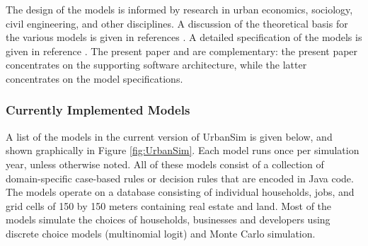 The design of the models is informed by research in urban
economics, sociology, civil engineering, and other disciplines.  A
discussion of the theoretical basis for the various models is
given in references
\citep{urbansim-reference-2000,waddell-env-and-planning-2000}.
A detailed specification of the models
is given in reference \citep{waddell-nse-2001}.
The present paper and \citep{waddell-nse-2001} are
complementary: the present paper concentrates on the supporting software
architecture, while the latter concentrates on the model specifications.

\subsubsection{Currently Implemented Models}

A list of the models in the current version of UrbanSim is given
below, and shown graphically in Figure \ref{fig:UrbanSim}. Each
model runs once per simulation year, unless otherwise noted.  All
of these models consist of a collection of domain-specific
case-based rules or decision rules that are encoded in Java code.
The models operate on a database consisting of individual
households, jobs, and grid cells of 150 by 150 meters containing
real estate and land.  Most of the models simulate the choices of
households, businesses and developers using discrete choice models
(multinomial logit) and Monte Carlo simulation.


